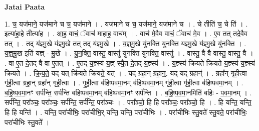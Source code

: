 \documentclass[17pt]{extarticle}
\begin{document}
\textbf{Jatai Paata} \newline

1. च॒ यज॑माने॒ यज॑माने च च॒ यज॑माने । . यज॑माने च च॒ यज॑माने॒ यज॑माने च । . चे तीति॑ च॒ चे ति॑ । . इत्या॑हा॒हे तीत्या॑ह । . आ॒ह॒ वाचं॒ ॅवाच॑ माहाह॒ वाच᳚म् । . वाच॑ मे॒वैव वाचं॒ ॅवाच॑ मे॒व । . ए॒व तत् तदे॒वैव तत् । . तद् य॑ज्ञ्मु॒खे य॑ज्ञ्मु॒खे तत् तद् य॑ज्ञ्मु॒खे । . य॒ज्ञ्॒मु॒खे यु॑नक्ति युनक्ति यज्ञ्मु॒खे य॑ज्ञ्मु॒खे यु॑नक्ति । . य॒ज्ञ्॒मु॒ख इति॑ यज्ञ् - मु॒खे । . यु॒न॒क्ति॒ वास्तु॒ वास्तु॑ युनक्ति युनक्ति॒ वास्तु॑ । . वास्तु॒ वै वै वास्तु॒ वास्तु॒ वै । . वा ए॒त दे॒तद् वै वा ए॒तत् । . ए॒तद् य॒ज्ञ्स्य॑ य॒ज्ञ् स्यै॒त दे॒तद् य॒ज्ञ्स्य॑ । . य॒ज्ञ्स्य॑ क्रियते क्रियते य॒ज्ञ्स्य॑ य॒ज्ञ्स्य॑ क्रियते । . क्रि॒य॒ते॒ यद् यत् क्रि॑यते क्रियते॒ यत् । . यद् ग्रहा॒न् ग्रहा॒न्॒. यद् यद् ग्रहान्॑ । . ग्रहा᳚न् गृही॒त्वा गृ॑ही॒त्वा ग्रहा॒न् ग्रहा᳚न् गृही॒त्वा । . गृ॒ही॒त्वा ब॑हिष्पवमा॒नम् ब॑हिष्पवमा॒नम् गृ॑ही॒त्वा गृ॑ही॒त्वा ब॑हिष्पवमा॒नम् । . ब॒हि॒ष्प॒व॒मा॒नꣳ सर्प॑न्ति॒ सर्प॑न्ति बहिष्पवमा॒नम् ब॑हिष्पवमा॒नꣳ सर्प॑न्ति । . ब॒हि॒ष्प॒व॒मा॒नमिति॑ बहिः - प॒व॒मा॒नम् । . सर्प॑न्ति॒ परा᳚ञ्चः॒ परा᳚ञ्चः॒ सर्प॑न्ति॒ सर्प॑न्ति॒ परा᳚ञ्चः । . परा᳚ञ्चो॒ हि हि परा᳚ञ्चः॒ परा᳚ञ्चो॒ हि । . हि यन्ति॒ यन्ति॒ हि हि यन्ति॑ । . यन्ति॒ परा॑चीभिः॒ परा॑चीभि॒र् यन्ति॒ यन्ति॒ परा॑चीभिः । . परा॑चीभिः स्तु॒वते᳚ स्तु॒वते॒ परा॑चीभिः॒ परा॑चीभिः स्तु॒वते᳚ । \newline
\end{document}
